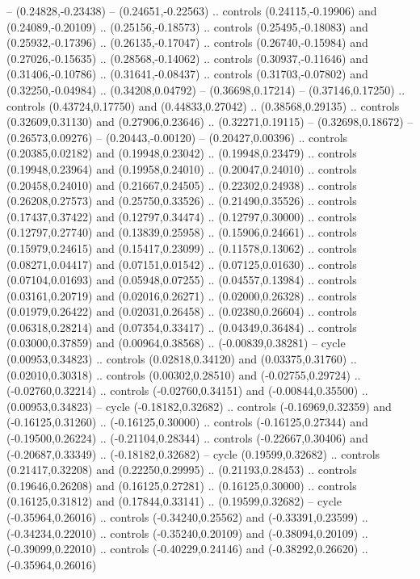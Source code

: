 {{-- (0.24828,-0.23438)
-- (0.24651,-0.22563)
.. controls (0.24115,-0.19906) and (0.24089,-0.20109) .. (0.25156,-0.18573)
.. controls (0.25495,-0.18083) and (0.25932,-0.17396) .. (0.26135,-0.17047)
.. controls (0.26740,-0.15984) and (0.27026,-0.15635) .. (0.28568,-0.14062)
.. controls (0.30937,-0.11646) and (0.31406,-0.10786) .. (0.31641,-0.08437)
.. controls (0.31703,-0.07802) and (0.32250,-0.04984) .. (0.34208,0.04792)
-- (0.36698,0.17214)
-- (0.37146,0.17250)
.. controls (0.43724,0.17750) and (0.44833,0.27042) .. (0.38568,0.29135)
.. controls (0.32609,0.31130) and (0.27906,0.23646) .. (0.32271,0.19115)
-- (0.32698,0.18672)
-- (0.26573,0.09276)
-- (0.20443,-0.00120)
-- (0.20427,0.00396)
.. controls (0.20385,0.02182) and (0.19948,0.23042) .. (0.19948,0.23479)
.. controls (0.19948,0.23964) and (0.19958,0.24010) .. (0.20047,0.24010)
.. controls (0.20458,0.24010) and (0.21667,0.24505) .. (0.22302,0.24938)
.. controls (0.26208,0.27573) and (0.25750,0.33526) .. (0.21490,0.35526)
.. controls (0.17437,0.37422) and (0.12797,0.34474) .. (0.12797,0.30000)
.. controls (0.12797,0.27740) and (0.13839,0.25958) .. (0.15906,0.24661)
.. controls (0.15979,0.24615) and (0.15417,0.23099) .. (0.11578,0.13062)
.. controls (0.08271,0.04417) and (0.07151,0.01542) .. (0.07125,0.01630)
.. controls (0.07104,0.01693) and (0.05948,0.07255) .. (0.04557,0.13984)
.. controls (0.03161,0.20719) and (0.02016,0.26271) .. (0.02000,0.26328)
.. controls (0.01979,0.26422) and (0.02031,0.26458) .. (0.02380,0.26604)
.. controls (0.06318,0.28214) and (0.07354,0.33417) .. (0.04349,0.36484)
.. controls (0.03000,0.37859) and (0.00964,0.38568) .. (-0.00839,0.38281)
-- cycle
(0.00953,0.34823)
.. controls (0.02818,0.34120) and (0.03375,0.31760) .. (0.02010,0.30318)
.. controls (0.00302,0.28510) and (-0.02755,0.29724) .. (-0.02760,0.32214)
.. controls (-0.02760,0.34151) and (-0.00844,0.35500) .. (0.00953,0.34823)
-- cycle
(-0.18182,0.32682)
.. controls (-0.16969,0.32359) and (-0.16125,0.31260) .. (-0.16125,0.30000)
.. controls (-0.16125,0.27344) and (-0.19500,0.26224) .. (-0.21104,0.28344)
.. controls (-0.22667,0.30406) and (-0.20687,0.33349) .. (-0.18182,0.32682)
-- cycle
(0.19599,0.32682)
.. controls (0.21417,0.32208) and (0.22250,0.29995) .. (0.21193,0.28453)
.. controls (0.19646,0.26208) and (0.16125,0.27281) .. (0.16125,0.30000)
.. controls (0.16125,0.31812) and (0.17844,0.33141) .. (0.19599,0.32682)
-- cycle
(-0.35964,0.26016)
.. controls (-0.34240,0.25562) and (-0.33391,0.23599) .. (-0.34234,0.22010)
.. controls (-0.35240,0.20109) and (-0.38094,0.20109) .. (-0.39099,0.22010)
.. controls (-0.40229,0.24146) and (-0.38292,0.26620) .. (-0.35964,0.26016)
}}
